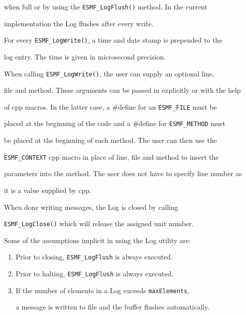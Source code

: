 when full or by using the {\tt ESMF\_LogFlush()} method.  In the current

implementation the Log flushes after every write.  


For every {\tt ESMF\_LogWrite()}, a time and date stamp is prepended to the

log entry.  The time is given in microsecond precision.


When calling {\tt ESMF\_LogWrite()}, the user can supply an optional line,

file and method.  These arguments can be passed in explicitly or with the help

of cpp macros.  In the latter case, a #define for an {\tt ESMF\_FILE} must be 

placed at the beginning of the code and a #define for {\tt ESMF\_METHOD} must

be placed at the beginning of each method.  The user can then use the

{\tt ESMF\_CONTEXT} cpp macro in place of line, file and method to insert the 

parameters into the method.  The user does not have to specify line number as

it is a value supplied by cpp.


When done writing messages, the Log is closed by calling 

{\tt ESMF\_LogClose()} which will release the assigned unit number.


Some of the assumptions implicit in using the Log utility are:


\begin{enumerate}


\item Prior to closing, {\tt ESMF\_LogFlush} is always executed.

\item Prior to halting, {\tt ESMF\_LogFlush} is always executed.

\item If the number of elements in a Log exceeds {\tt maxElements}, 

a message is written to file and the buffer flushes automatically.


\end{enumerate}





